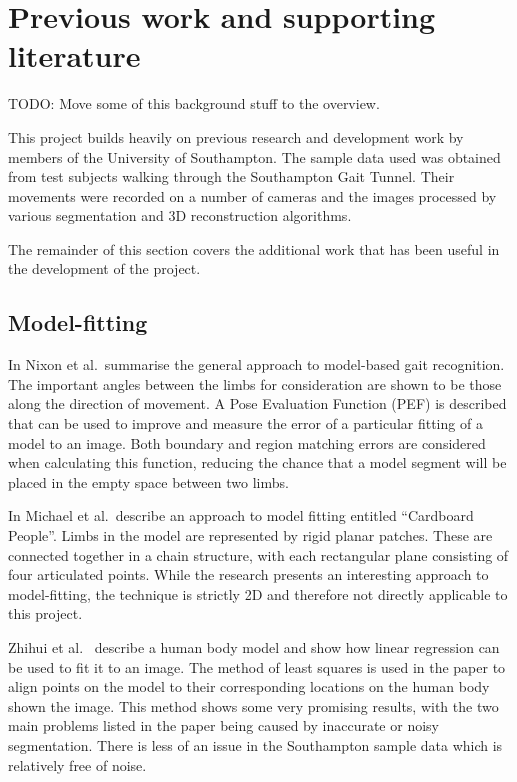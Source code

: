 \section{Previous work and supporting literature}

TODO: Move some of this background stuff to the overview.

This project builds heavily on previous research and development work by members of the University of Southampton.
The sample data used was obtained from test subjects walking through the Southampton Gait Tunnel.
Their movements were recorded on a number of cameras and the images processed by various segmentation and 3D reconstruction algorithms.

The remainder of this section covers the additional work that has been useful in the development of the project.

\subsection{Model-fitting}

In \cite{GaitBook} Nixon et al.\ summarise the general approach to model-based gait recognition.
The important angles between the limbs for consideration are shown to be those along the direction of movement.
A Pose Evaluation Function (PEF) is described that can be used to improve and measure the error of a particular fitting of a model to an image.
Both boundary and region matching errors are considered when calculating this function, reducing the chance that a model segment will be placed in the empty space between two limbs.

\bigskip
\noindent In \cite{cardboardpeople} Michael et al.\ describe an approach to model fitting entitled ``Cardboard People''.
Limbs in the model are represented by rigid planar patches.
These are connected together in a chain structure, with each rectangular plane consisting of four articulated points.
While the research presents an interesting approach to model-fitting, the technique is strictly 2D and therefore not directly applicable to this project.

\bigskip
\noindent Zhihui et al.\ \cite{LinearModelFitting} describe a human body model and show how linear regression can be used to fit it to an image.
The method of least squares is used in the paper to align points on the model to their corresponding locations on the human body shown the image.
This method shows some very promising results, with the two main problems listed in the paper being caused by inaccurate or noisy segmentation.
There is less of an issue in the Southampton sample data which is relatively free of noise.

